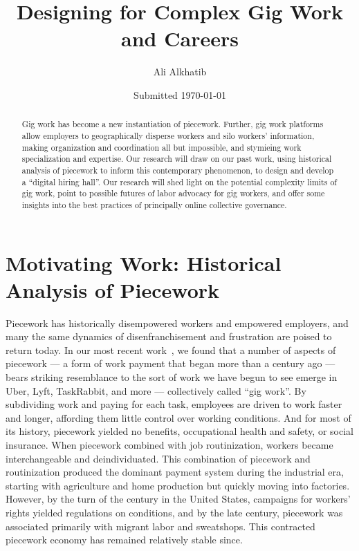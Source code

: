 \documentclass{article}
\title{Designing for Complex Gig Work and Careers}
\author{Ali Alkhatib}
\date{Submitted \today}
\newcommand{\topic}[1]{{\color{Blue}#1}}
\begin{document}
  \begin{abstract}
Gig work has become a new instantiation of piecework.
Further, gig work platforms allow employers to geographically disperse workers and silo workers' information,
making organization and coordination all but impossible,
and stymieing work specialization and expertise.
Our research will draw on our past work, using historical analysis of piecework to inform this contemporary phenomenon,
to design and develop a ``digital hiring hall''.
Our research will
shed light on the potential complexity limits of gig work,
point to possible futures of labor advocacy for gig workers,
and offer some insights into the best practices of principally online collective governance.
  \end{abstract}


\section*{Motivating Work: Historical Analysis of Piecework}
\topic{Piecework has historically disempowered workers and empowered employers, and
many the same dynamics of disenfranchisement and frustration are poised to return today.}
In our most recent work~\cite{pieceworkCrowdworkGigwork}, we found that a number of aspects of piecework
--- a form of work payment that began more than a century ago ---
bears striking resemblance to the sort of work we have begun to see emerge in Uber, Lyft, TaskRabbit, and more
--- collectively called ``gig work''.
By subdividing work and paying for each task, employees are driven to work faster and longer,
affording them little control over working conditions.
And for most of its history, piecework yielded no benefits, occupational health and safety, or social insurance.
When piecework combined with job routinization, workers became interchangeable and deindividuated.
This combination of piecework and routinization produced the dominant payment system during the industrial era,
starting with agriculture and home production but quickly moving into factories.
However, by the turn of the  century in the United States,
campaigns for workers' rights yielded regulations on conditions, and by the late  century,
piecework was associated primarily with migrant labor and sweatshops.
This contracted piecework economy has remained relatively stable since.
\end{document}

